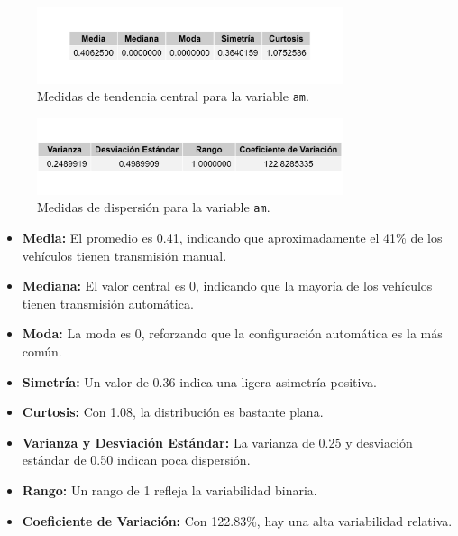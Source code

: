 \documentclass{article}
\begin{document}
\begin{enumerate}
	      \begin{figure}[H]
		      \centering
		      \includegraphics[width=0.8\textwidth]{MTC/am_central.png}
		      \caption{Medidas de tendencia central para la variable \texttt{am}.}
		      \label{fig:am_central}
	      \end{figure}

	      \begin{figure}[H]
		      \centering
		      \includegraphics[width=0.8\textwidth]{MTC/am_dispersion.png}
		      \caption{Medidas de dispersión para la variable \texttt{am}.}
		      \label{fig:am_dispersion}
	      \end{figure}
	     
	      \begin{itemize}
		      \item \textbf{Media:} El promedio es 0.41, indicando que aproximadamente el 41\% de los vehículos tienen transmisión manual.
		      \item \textbf{Mediana:} El valor central es 0, indicando que la mayoría de los vehículos tienen transmisión automática.
		      \item \textbf{Moda:} La moda es 0, reforzando que la configuración automática es la más común.
		      \item \textbf{Simetría:} Un valor de 0.36 indica una ligera asimetría positiva.
		      \item \textbf{Curtosis:} Con 1.08, la distribución es bastante plana.
		      \item \textbf{Varianza y Desviación Estándar:} La varianza de 0.25 y desviación estándar de 0.50 indican poca dispersión.
		      \item \textbf{Rango:} Un rango de 1 refleja la variabilidad binaria.
		      \item \textbf{Coeficiente de Variación:} Con 122.83\%, hay una alta variabilidad relativa.
	      \end{itemize}


\end{enumerate}
\end{document}

